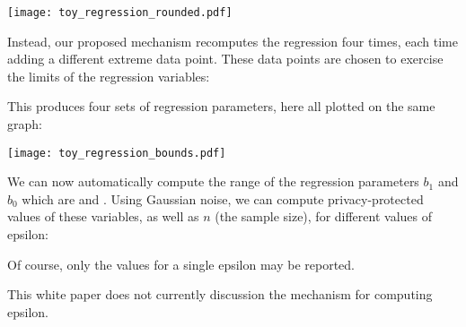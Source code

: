 \documentclass{article}
\begin{document}
\texttt{[image: toy\_regression\_rounded.pdf]}

Instead, our proposed mechanism recomputes the regression four times,
each time adding a different extreme data point. These data points are
chosen to exercise the limits of the regression variables:



This produces four sets of regression parameters, here all plotted on
the same graph:

\texttt{[image: toy\_regression\_bounds.pdf]}

We can now automatically compute the range of the regression
parameters $b_1$ and $b_0$ which are \Gzero{} and \Gone. Using Gaussian noise, we can compute 
privacy-protected values of these variables, as well as $n$ (the
sample size), for different values of epsilon:



Of course, only the values for a single epsilon may be reported. 

This white paper does not currently discussion the mechanism for
computing epsilon. 
\end{document}

